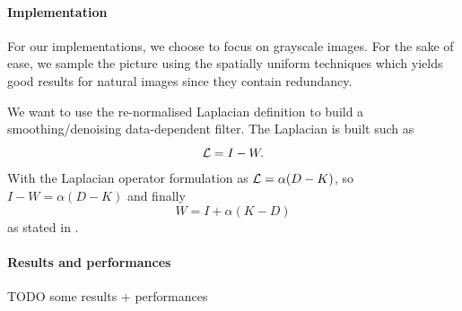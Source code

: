 \paragraph{Implementation}
For our implementations, we choose to focus on grayscale images.
For the sake of ease, we sample the picture using the spatially uniform techniques which yields good results for natural images since they contain redundancy.

We want to use the re-normalised Laplacian definition to build a smoothing/denoising data-dependent filter.
The Laplacian is built such as
\[\operatorname{\mathcal{L}} = I-W.\]
With the Laplacian operator formulation as \(\operatorname{\mathcal{L}} = \alpha (D-K)\), so \(I-W = \alpha (D-K)\) and finally
\[W = I + \alpha (K-D)\]
as stated in \cite{milanfar_new_2016}.

\paragraph{Results and performances}
TODO some results + performances
